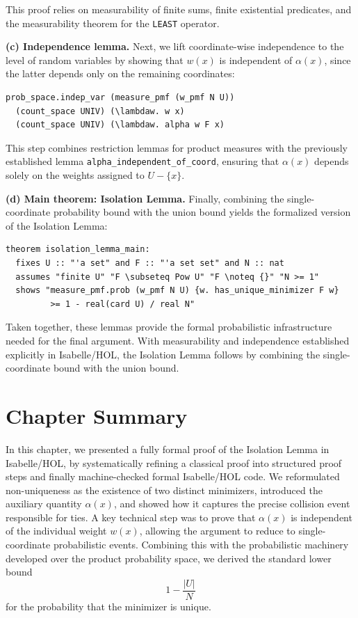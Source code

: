 This proof relies on measurability of finite sums, finite existential predicates, and the measurability theorem for the \texttt{LEAST} operator.

\medskip

\noindent
\textbf{(c) Independence lemma.}
Next, we lift coordinate-wise independence to the level of random variables by showing that $w(x)$ is independent of $\alpha(x)$, since the latter depends only on the remaining coordinates:
\listingneedspace
\begin{lstlisting}[language=Isabelle, caption={Independence of Coordinate and Alpha}]
prob_space.indep_var (measure_pmf (w_pmf N U))
  (count_space UNIV) (\lambdaw. w x)
  (count_space UNIV) (\lambdaw. alpha w F x)
\end{lstlisting}

This step combines restriction lemmas for product measures with the previously established lemma \texttt{alpha\_independent\_of\_coord}, ensuring that $\alpha(x)$ depends solely on the weights assigned to $U-\{x\}$.

\medskip

\noindent
\textbf{(d) Main theorem: Isolation Lemma.}
Finally, combining the single-coordinate probability bound with the union bound yields the formalized version of the Isolation Lemma:
\listingneedspace
\begin{lstlisting}[language=Isabelle, caption={Main Theorem: Isolation Lemma}]
theorem isolation_lemma_main:
  fixes U :: "'a set" and F :: "'a set set" and N :: nat
  assumes "finite U" "F \subseteq Pow U" "F \noteq {}" "N >= 1"
  shows "measure_pmf.prob (w_pmf N U) {w. has_unique_minimizer F w}
         >= 1 - real(card U) / real N"
\end{lstlisting}

Taken together, these lemmas provide the formal probabilistic infrastructure needed for the final argument.
With measurability and independence established explicitly in Isabelle/HOL, the Isolation Lemma follows by combining the single-coordinate bound with the union bound.

\section{Chapter Summary}
In this chapter, we presented a fully formal proof of the Isolation Lemma in Isabelle/HOL, by systematically refining a classical proof into structured proof steps and finally machine-checked formal Isabelle/HOL code.
We reformulated non-uniqueness as the existence of two distinct minimizers, introduced the auxiliary quantity $\alpha(x)$, and showed how it captures the precise collision event responsible for ties.
A key technical step was to prove that $\alpha(x)$ is independent of the individual weight $w(x)$, allowing the argument to reduce to single-coordinate probabilistic events.
Combining this with the probabilistic machinery developed over the product probability space, we derived the standard lower bound
\[
1 - \frac{|U|}{N}
\]
for the probability that the minimizer is unique.